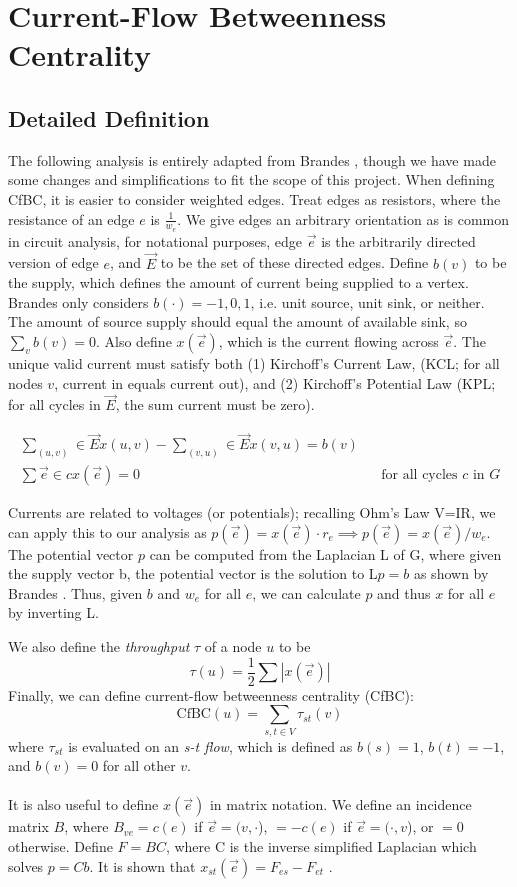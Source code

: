 \documentclass{article}
\begin{document}
\newpage



\newpage

\appendix 
\section{Current-Flow Betweenness Centrality}
\subsection{Detailed Definition}
The following analysis is entirely adapted from Brandes \cite{current}, though we have made some changes and simplifications to fit the scope of this project. When defining CfBC, it is easier to consider weighted edges. Treat edges as resistors, where the resistance of an edge $e$ is $\frac{1}{w_e}$. We give edges an arbitrary orientation as is common in circuit analysis, for notational purposes, edge $\Vec{e}$ is the arbitrarily directed version of edge $e$, and $\Vec{E}$ to be the set of these directed edges. Define $b(v)$ to be the supply, which defines the amount of current being supplied to a vertex. Brandes only considers $b(\cdot) = {-1, 0, 1}$, i.e. unit source, unit sink, or neither. The amount of source supply should equal the amount of available sink, so $\sum_v b(v) = 0$. Also define $x(\Vec{e})$, which is the current flowing across $\Vec{e}$. The unique valid current must satisfy both (1) Kirchoff's Current Law, (KCL; for all nodes $v$, current in equals current out), and (2) Kirchoff's Potential Law (KPL; for all cycles in $\Vec{E}$, the sum current must be zero).

\begin{align}
   \sum_{(u,v)} \in \Vec{E} x(u, v) - \sum_{(v, u)} \in \Vec{E} x(v, u) = b(v) \\
   \sum{\Vec{e} \in c} x(\Vec{e}) = 0 && \text{for all cycles $c$ in $G$}
\end{align}

Currents are related to voltages (or potentials); recalling Ohm’s Law V=IR, we can apply this to our analysis as $p(\Vec{e}) = x(\Vec{e}) \cdot r_e \implies p(\Vec{e}) = x(\Vec{e}) / w_e$. The potential vector $p$ can be computed from the Laplacian L of G, where given the supply vector b, the potential vector is the solution to L$p = b$ as shown by Brandes \cite{current}. Thus, given $b$ and $w_e$ for all $e$, we can calculate $p$ and thus $x$ for all $e$ by inverting L.

We also define the \textit{throughput} $\tau$ of a node $u$ to be $$\tau(u) = \frac{1}{2} \sum | x(\Vec{e}) |$$
Finally, we can define current-flow betweenness centrality (CfBC): $$ \text{CfBC}(u) = \sum_{s,t \in V} \tau_{st}(v)$$ where $\tau_{st}$ is evaluated on an \textit{s-t flow}, which is defined as $b(s) = 1$, $b(t) = -1$, and $b(v) = 0$ for all other $v$.
\\\\
It is also useful to define $x(\Vec{e})$ in matrix notation. We define an incidence matrix $B$, where $B_{ve} = c(e)$ if $\Vec{e} = (v, \cdot$), $= -c(e)$ if $\Vec{e} = (\cdot, v$), or $= 0$ otherwise. Define $F = BC$, where C is the inverse simplified Laplacian which solves $p = C b$. It is shown that $x_{st}(\Vec{e}) = F_{es} - F_{et}$ \cite{current}.
\end{document}
